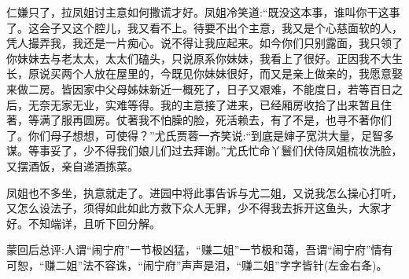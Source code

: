 \begin{parag}
仁嫌只了，拉凤姐讨主意如何撒谎才好。凤姐冷笑道:“既没这本事，谁叫你干这事了。这会子又这个腔儿，我又看不上。待要不出个主意，我又是个心慈面软的人，凭人撮弄我，我还是一片痴心。说不得让我应起来。如今你们只别露面，我只领了你妹妹去与老太太，太太们磕头，只说原系你妹妹，我看上了很好。正因我不大生长，原说买两个人放在屋里的，今既见你妹妹很好，而又是亲上做亲的，我愿意娶来做二房。皆因家中父母姊妹新近一概死了，日子又艰难，不能度日，若等百日之后，无奈无家无业，实难等得。我的主意接了进来，已经厢房收拾了出来暂且住著，等满了服再圆房。仗著我不怕臊的脸，死活赖去，有了不是，也寻不著你们了。你们母子想想，可使得？”尤氏贾蓉一齐笑说:“到底是婶子宽洪大量，足智多谋。等事妥了，少不得我们娘儿们过去拜谢。”尤氏忙命丫鬟们伏侍凤姐梳妆洗脸，又摆酒饭，亲自递酒拣菜。
\end{parag}


\begin{parag}
    凤姐也不多坐，执意就走了。进园中将此事告诉与尤二姐，又说我怎么操心打听，又怎么设法子，须得如此如此方救下众人无罪，少不得我去拆开这鱼头，大家才好。不知端详，且听下回分解。
\end{parag}


\begin{parag}
    \begin{note}蒙回后总评:人谓“闹宁府”一节极凶猛，“赚二姐”一节极和蔼，吾谓“闹宁府”情有可恕，“赚二姐”法不容诛，“闹宁府”声声是泪，“赚二姐”字字皆针(左金右夅)。\end{note}
\end{parag}
